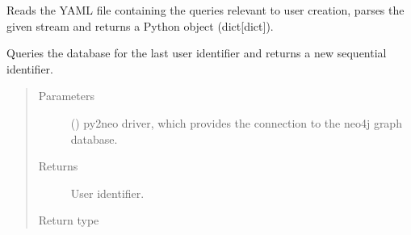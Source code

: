 \documentclass[letterpaper,10pt,english]{sphinxmanual}
\begin{document}

\begin{fulllineitems}
\label{\detokenize{_autosummary/graphdb_builder.users:graphdb_builder.users.users_controller.get_user_creation_queries}}
Reads the YAML file containing the queries relevant to user creation, parses the given stream and     returns a Python object (dict{[}dict{]}).

\end{fulllineitems}


\begin{fulllineitems}
\label{\detokenize{_autosummary/graphdb_builder.users:graphdb_builder.users.users_controller.get_new_user_identifier}}
Queries the database for the last user identifier and returns a new sequential identifier.
\begin{quote}\begin{description}
\item[{Parameters}] \leavevmode
{} () \textendash{} py2neo driver, which provides the connection to the neo4j graph database.

\item[{Returns}] \leavevmode
User identifier.

\item[{Return type}] \leavevmode
{}

\end{description}\end{quote}

\end{fulllineitems}

\end{document}
